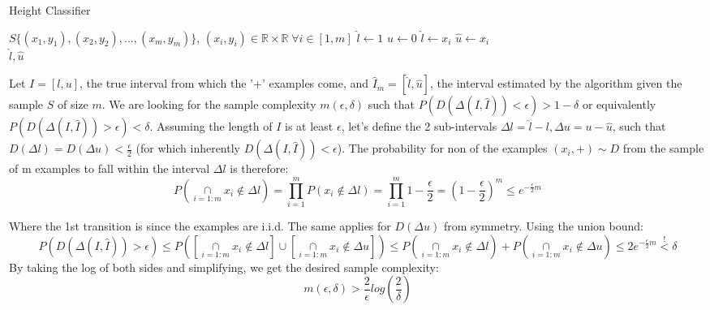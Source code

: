 \begin{algorithm}
    \caption{Height Classifier}\label{alg:cap}
    \begin{algorithmic}
        \Require $S\{(x_1, y_1), (x_2, y_2), ..., (x_m, y_m)\}$, $(x_i, y_i) \in \mathbb{R} \times \mathbb{R} \; \forall i \in [1, m]$
        \State $\hat{l} \gets 1$
        \State $\hat{u} \gets 0$
                    \State $\hat{l} \gets x_i$
                \EndIf
                    \State $\hat{u} \gets x_i$
                \EndIf
            \EndIf
        \EndFor \\
    \Return $\hat{l}, \hat{u}$
    \end{algorithmic}
\end{algorithm}

Let $I = [l, u]$, the true interval from which the '+' examples come, and $\hat{I}_m = [\hat{l}, \hat{u}]$, 
the interval estimated by the algorithm given the sample $S$ of size $m$.
We are looking for the sample complexity $m(\epsilon, \delta)$ such that $P(D(\Delta(I, \hat{I})) < \epsilon) > 1-\delta$ 
or equivalently $P(D(\Delta(I, \hat{I})) > \epsilon) < \delta$.
Assuming the length of $I$ is at least $\epsilon$, let's define the 2 sub-intervals $\Delta l = \hat{l} - l, \Delta u = u - \hat{u}$, 
such that $D(\Delta l) = D(\Delta u) < \frac{\epsilon}{2}$ (for which inherently $D(\Delta(I, \hat{I})) < \epsilon$).
The probability for non of the examples $(x_i, +) \sim D$ from the sample of m examples to fall within the interval $\Delta l$ is therefore:
\begin{equation*}
    P(\underset{i=1:m}{\cap} x_i \notin \Delta l) = \prod_{i=1}^{m}P(x_i \notin \Delta l) 
    = \prod_{i=1}^{m} 1-\frac{\epsilon}{2}= (1-\frac{\epsilon}{2})^m \leq e^{-\frac{\epsilon}{2}m}
\end{equation*}

Where the 1st transition is since the examples are i.i.d. The same applies for $D(\Delta u)$ from symmetry.
Using the union bound:
\begin{equation*}
    P(D(\Delta(I, \hat{I})) > \epsilon) \leq P\left(\left[\underset{i=1:m}{\cap} x_i \notin \Delta l\right] \cup \left[\underset{i=1:m}{\cap} x_i \notin \Delta u\right]\right) 
    \leq P(\underset{i=1:m}{\cap} x_i \notin \Delta l) +  P(\underset{i=1:m}{\cap} x_i \notin \Delta u) \leq 2e^{-\frac{\epsilon}{2}m} \overset{!}{<} \delta
\end{equation*}
By taking the log of both sides and simplifying, we get the desired sample complexity:
\begin{equation*}
    m(\epsilon, \delta) > \frac{2}{\epsilon} log(\frac{2}{\delta})
\end{equation*}



